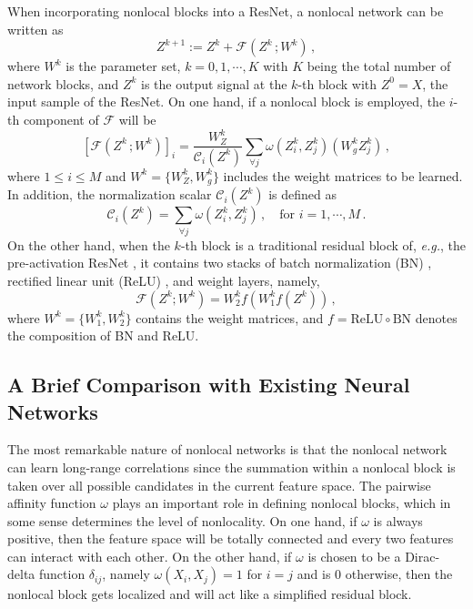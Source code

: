 \documentclass{article}
\begin{document}
When incorporating nonlocal blocks into a ResNet, a nonlocal network can be written as
\begin{equation}\label{nl-net}
Z^{k+1} := Z^k + \mathcal{F}(Z^k\, ;W^k)\,,
\end{equation}
where $W^k$ is the parameter set, $k=0,1,\cdots,K$ with $K$ being the total number of network blocks, and $Z^k$ is the output signal at the $k$-th block with $Z^0=X$, the input sample of the ResNet. On one hand, if a nonlocal block is employed, the $i$-th component of $\mathcal{F}$ will be
\begin{equation}\label{nl-op}
\left[\mathcal{F}(Z^k\, ;W^k)\right]_i = \frac{W_Z^k}{\mathcal{C}_i(Z^k)}\sum_{\forall j} \omega(Z^k_i,Z^k_j) (W_g^k Z^k_j)\,,
\end{equation}
where $1\le i\le M$ and $W^k=\{W^k_{Z},  W^k_{g}\}$ includes the weight matrices to be learned. In addition, the normalization scalar $\mathcal{C}_i(Z^k)$ is defined as
\begin{equation}
\mathcal{C}_i(Z^k)=\sum_{\forall j} \omega(Z^k_i,Z^k_j)\,,\quad \text{for }i=1,\cdots,M\,.
\end{equation}
On the other hand, when the $k$-th block is a traditional residual block of, \textit{e.g.}, the pre-activation ResNet \cite{he2016identity}, it contains two stacks of batch normalization (BN) \cite{ioffe2015batch}, rectified linear unit (ReLU) \cite{nair2010rectified}, and weight layers, namely,
\begin{equation}\label{resnet-f}
\mathcal{F}(Z^k; W^k) = W^k_2 f \left(W^k_{1} f(Z^k) \right)\,,
\end{equation}
where $W^k=\{W^k_{1},  W^k_{2}\}$ contains the weight matrices, and $f = \text{ReLU}\circ \text{BN}$ denotes the composition of BN and ReLU.

\subsection{A Brief Comparison with Existing Neural Networks}
The most remarkable nature of nonlocal networks is that the nonlocal network can learn long-range correlations since the summation within a nonlocal block is taken over all possible candidates in the current feature space. The pairwise affinity function $\omega$ plays an important role in defining nonlocal blocks, which in some sense determines the level of nonlocality. On one hand, if $\omega$ is always positive, then the feature space will be totally connected and every two features can interact with each other. On the other hand, if $\omega$ is chosen to be a Dirac-delta function $\delta_{ij}$, namely $\omega(X_i,X_j)=1$ for $i=j$ and is $0$ otherwise, then the nonlocal block gets localized and will act like a simplified residual block. 
\end{document}

